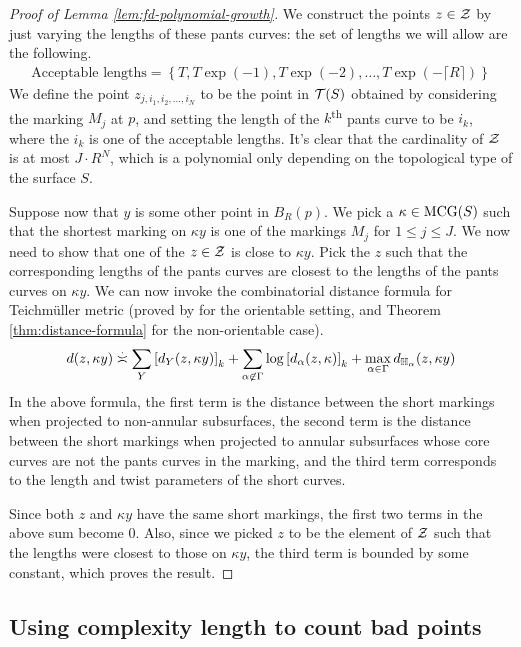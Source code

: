 \begin{proof}[Proof of Lemma \ref{lem:fd-polynomial-growth}]
  We construct the points $z \in \mathcal{Z}$ by just varying the lengths of these pants curves: the set of lengths we will allow are the following.
  \begin{align*}
    \text{Acceptable lengths} = \left\{ T, T \exp(-1), T\exp(-2), \ldots, T \exp(-\lceil R \rceil) \right\}
  \end{align*}
  We define the point $z_{j, i_1, i_2, \ldots , i_N}$ to be the point in $\mathcal{T}(S)$ obtained by considering the marking $M_j$ at $p$, and setting the length of the $k$\textsuperscript{th} pants curve to be $i_k$, where the $i_k$ is one of the acceptable lengths.
  It's clear that the cardinality of $\mathcal{Z}$ is at most $J \cdot R^N$, which is a polynomial only depending on the topological type of the surface $S$.

  Suppose now that $y$ is some other point in $B_R(p)$.
  We pick a $\kappa \in \mathrm{MCG}(S)$ such that the shortest marking on $\kappa y$ is one of the markings $M_j$ for $1 \leq j \leq J$.
  We now need to show that one of the $z \in \mathcal{Z}$ is close to $\kappa y$.
  Pick the $z$ such that the corresponding lengths of the pants curves are closest to the lengths of the pants curves on $\kappa y$.
  We can now invoke the combinatorial distance formula for Teichmüller metric (proved by \textcite{rafi2007combinatorial} for the orientable setting, and Theorem \ref{thm:distance-formula} for the non-orientable case).
  \begin{align*}
    d(z, \kappa y) \emul \sum_Y \left[ d_Y(z, \kappa y) \right]_k + \sum_{\alpha \not \in \Gamma} \log \left[ d_{\alpha} (z, \kappa) \right]_k + \max_{\alpha \in \Gamma} d_{\mathbb{H}_{\alpha}} (z, \kappa y)
  \end{align*}
  In the above formula, the first term is the distance between the short markings when projected to non-annular subsurfaces, the second term is the distance between the short markings when projected to annular subsurfaces whose core curves are not the pants curves in the marking, and the third term corresponds to the length and twist parameters of the short curves.

  Since both $z$ and $\kappa y$ have the same short markings, the first two terms in the above sum become $0$.
  Also, since we picked $z$ to be the element of $\mathcal{Z}$ such that the lengths were closest to those on $\kappa y$, the third term is bounded by some constant, which proves the result.
\end{proof}


\subsection{Using complexity length to count bad points}
\label{sec:using-compl-length}

